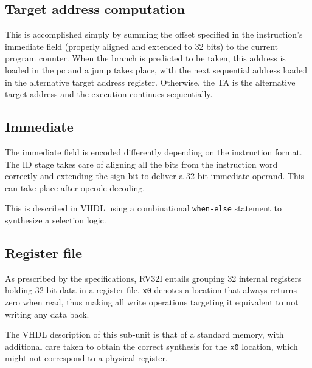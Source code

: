 \subsection{Target address computation} This is accomplished simply by summing the offset specified in the instruction's immediate field (properly aligned and extended to 32 bits) to the current program counter. When the branch is predicted to be taken, this address is loaded in the pc and a jump takes place, with the next sequential address loaded in the alternative target address register. Otherwise, the TA is the alternative target address and the execution continues sequentially.

\subsection{Immediate} The immediate field is encoded differently depending on the instruction format. The ID stage takes care of aligning all the bits from the instruction word correctly and extending the sign bit to deliver a 32-bit immediate operand. This can take place after opcode decoding.

This is described in VHDL using a combinational \texttt{when-else} statement to synthesize a selection logic.

\subsection{Register file} As prescribed by the specifications, RV32I entails grouping 32 internal registers holding 32-bit data in a register file. \texttt{x0} denotes a location that always returns zero when read, thus making all write operations targeting it equivalent to not writing any data back.  

The VHDL description of this sub-unit is that of a standard memory, with additional care taken to obtain the correct synthesis for the \texttt{x0} location, which might not correspond to a physical register.